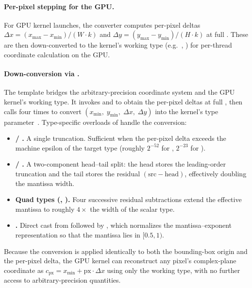 \paragraph{Per-pixel stepping for the GPU.}
For GPU kernel launches, the converter computes per-pixel deltas
$\Delta x = (x_{\max}-x_{\min})/(W \cdot k)$ and
$\Delta y = (y_{\max}-y_{\min})/(H \cdot k)$ at full
.  These are then down-converted to the
kernel's working type (e.g.\ , ) for
per-thread coordinate calculation on the GPU.

\paragraph{Down-conversion via .}
The  template bridges the arbitrary-precision
coordinate system and the GPU kernel's working type.  It invokes
 and  to obtain the per-pixel deltas
at full , then calls  four times
to convert $(x_{\min},\; y_{\min},\; \Delta x,\; \Delta y)$ into the
kernel's type parameter~.  Type-specific overloads of
 handle the conversion:
\begin{itemize}
  \item \textbf{ / .}  A single
         truncation.  Sufficient when the
        per-pixel delta exceeds the machine epsilon of the target type
        (roughly $2^{-52}$ for , $2^{-23}$ for ).
  \item \textbf{ / .}  A two-component
        head--tail split: the head stores the leading-order truncation
        and the tail stores the residual $(\text{src} - \text{head})$,
        effectively doubling the mantissa width.
  \item \textbf{Quad types (, ).}
        Four successive residual subtractions extend the effective mantissa
        to roughly $4\times$ the width of the scalar type.
  \item \textbf{.}  Direct cast from
         followed by , which
        normalizes the mantissa--exponent representation so that the
        mantissa lies in $[0.5,1)$.
\end{itemize}
Because the conversion is applied identically to both the bounding-box
origin and the per-pixel delta, the GPU kernel can reconstruct any
pixel's complex-plane coordinate as
$c_{\text{px}} = x_{\min} + \text{px}\cdot\Delta x$ using only the
working type, with no further access to arbitrary-precision quantities.

